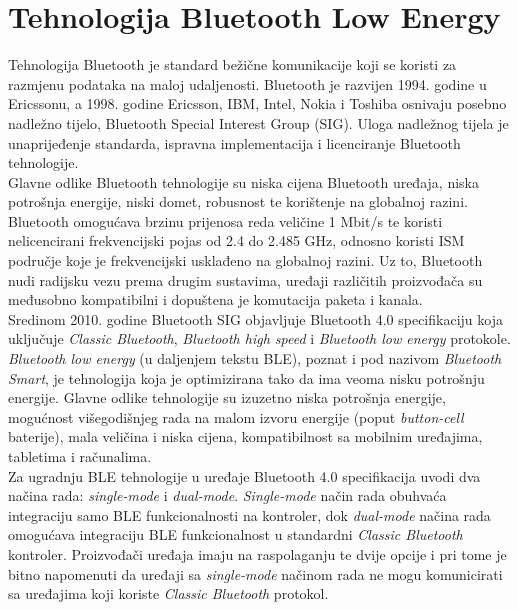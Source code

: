 \chapter{Tehnologija Bluetooth Low Energy}

Tehnologija Bluetooth je standard bežične komunikacije koji se koristi za razmjenu podataka na maloj udaljenosti. 
Bluetooth je razvijen 1994. godine u Ericssonu, a 1998. godine Ericsson, IBM, Intel, Nokia i Toshiba osnivaju posebno nadležno tijelo, Bluetooth Special Interest Group (SIG). 
Uloga nadležnog tijela je unaprijeđenje standarda, ispravna implementacija i licenciranje Bluetooth tehnologije.
\\

Glavne odlike Bluetooth tehnologije su niska cijena Bluetooth uređaja, niska potrošnja energije, niski domet, robusnost te korištenje na globalnoj razini. 
Bluetooth omogućava brzinu prijenosa reda veličine 1 Mbit/s te koristi nelicencirani frekvencijski pojas od 2.4 do 2.485 GHz, odnosno koristi ISM područje  koje je frekvencijski usklađeno na globalnoj razini. 
Uz to, Bluetooth nudi radijsku vezu prema drugim sustavima, uređaji različitih proizvođača su međusobno kompatibilni i dopuštena je komutacija paketa i kanala.
\\

Sredinom 2010. godine Bluetooth SIG objavljuje Bluetooth 4.0 specifikaciju koja uključuje \textit{Classic Bluetooth}, \textit{Bluetooth high speed} i \textit{Bluetooth low energy} protokole.
\\
\textit{Bluetooth low energy} (u daljenjem tekstu BLE), poznat i pod nazivom \textit{Bluetooth Smart}, je tehnologija koja je optimizirana tako da ima veoma nisku potrošnju energije. 
Glavne odlike tehnologije su izuzetno niska potrošnja energije, mogućnost višegodišnjeg rada na malom izvoru energije (poput \textit{button-cell} baterije), mala veličina i niska cijena, kompatibilnost sa mobilnim uređajima, tabletima i računalima. 
\\
Za ugradnju BLE tehnologije u uređaje Bluetooth 4.0 specifikacija uvodi dva načina rada: \textit{single-mode} i \textit{dual-mode}. 
\textit{Single-mode} način rada obuhvaća integraciju samo BLE funkcionalnosti na kontroler, dok \textit{dual-mode} načina rada omogućava integraciju BLE funkcionalnost u standardni \textit{Classic Bluetooth} kontroler. 
Proizvođači uređaja imaju na raspolaganju te dvije opcije i pri tome je bitno napomenuti da uređaji sa \textit{single-mode} načinom rada ne mogu komunicirati sa uređajima koji koriste \textit{Classic Bluetooth} protokol.
\\


